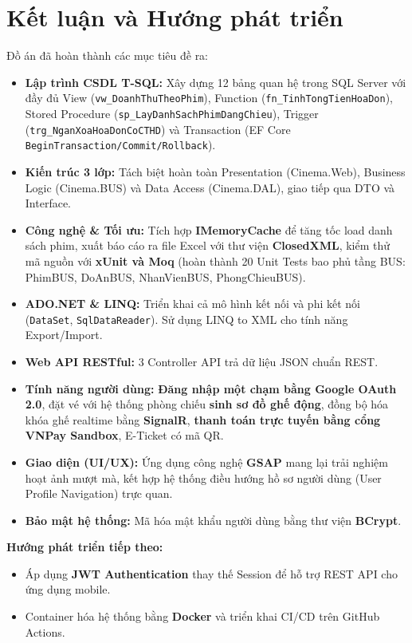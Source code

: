 \documentclass[12pt,a4paper,oneside]{book}
\theoremstyle{plain}
\numberwithin{equation}{chapter}
\begin{document}
\chapter{Kết luận và Hướng phát triển}

\noindent Đồ án đã hoàn thành các mục tiêu đề ra:

\begin{itemize}
    \item \textbf{Lập trình CSDL T-SQL:} Xây dựng 12 bảng quan hệ trong SQL Server với đầy đủ View (\texttt{vw\_DoanhThuTheoPhim}), Function (\texttt{fn\_TinhTongTienHoaDon}), Stored Procedure (\texttt{sp\_LayDanhSachPhimDangChieu}), Trigger (\texttt{trg\_NganXoaHoaDonCoCTHD}) và Transaction (EF Core \texttt{BeginTransaction/Commit/Rollback}).
    \item \textbf{Kiến trúc 3 lớp:} Tách biệt hoàn toàn Presentation (Cinema.Web), Business Logic (Cinema.BUS) và Data Access (Cinema.DAL), giao tiếp qua DTO và Interface.
    \item \textbf{Công nghệ \& Tối ưu:} Tích hợp \textbf{IMemoryCache} để tăng tốc load danh sách phim, xuất báo cáo ra file Excel với thư viện \textbf{ClosedXML}, kiểm thử mã nguồn với \textbf{xUnit và Moq} (hoàn thành 20 Unit Tests bao phủ tầng BUS: PhimBUS, DoAnBUS, NhanVienBUS, PhongChieuBUS).
    \item \textbf{ADO.NET \& LINQ:} Triển khai cả mô hình kết nối và phi kết nối (\texttt{DataSet}, \texttt{SqlDataReader}). Sử dụng LINQ to XML cho tính năng Export/Import.
    \item \textbf{Web API RESTful:} 3 Controller API trả dữ liệu JSON chuẩn REST.
    \item \textbf{Tính năng người dùng:} \textbf{Đăng nhập một chạm bằng Google OAuth 2.0}, đặt vé với hệ thống phòng chiếu \textbf{sinh sơ đồ ghế động}, đồng bộ hóa khóa ghế realtime bằng \textbf{SignalR}, \textbf{thanh toán trực tuyến bằng cổng VNPay Sandbox}, E-Ticket có mã QR.
    \item \textbf{Giao diện (UI/UX):} Ứng dụng công nghệ \textbf{GSAP} mang lại trải nghiệm hoạt ảnh mượt mà, kết hợp hệ thống điều hướng hồ sơ người dùng (User Profile Navigation) trực quan.
    \item \textbf{Bảo mật hệ thống:} Mã hóa mật khẩu người dùng bằng thư viện \textbf{BCrypt}.
\end{itemize}

\noindent\textbf{Hướng phát triển tiếp theo:}

\begin{itemize}
    \item Áp dụng \textbf{JWT Authentication} thay thế Session để hỗ trợ REST API cho ứng dụng mobile.
    \item Container hóa hệ thống bằng \textbf{Docker} và triển khai CI/CD trên GitHub Actions.
\end{itemize}
\end{document}
